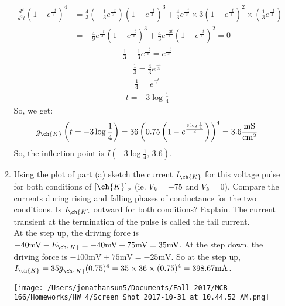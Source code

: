 \documentclass[11pt]{article}
\begin{document}
\begin{enumerate}[label=\arabic*.]
\begin{enumerate}[label=(\alph*)]
\begin{align*}
\frac{d^2} {d^2t} \left(1 - e^{\frac{-t} {3}}\right)^4 &= \frac{4} {3} \left(-\frac{1} {3} e^{\frac{-t} {3}}\right) \left(1 - e^{\frac{-t} {3}}\right)^3 + \frac{4} {3} e^{\frac{-t} {3}} \times 3 \left(1 - e^{\frac{-t} {3}}\right)^2 \times \left(\frac{1} {3} e^{\frac{-t} {3}}\right) \\
&= -\frac{4} {9} e^{\frac{-t} {3}} \left(1 - e^{\frac{-t} {3}}\right)^3 + \frac{4} {3} e^{\frac{-2t} {3}} \left(1 - e^{\frac{-t} {3}}\right)^2 = 0
\end{align*}
\begin{align*}
\frac{1} {3} - \frac{1} {3} e^{\frac{-t} {3}} = e^{\frac{-t} {3}}
\end{align*}
\begin{align*}
\frac{1} {3} = \frac{4} {3} e^{\frac{-t} {3}}
\end{align*}
\begin{align*}
\frac{1} {4} = e^{\frac{-t} {3}}
\end{align*}
\begin{align*}
t = -3 \log{\frac{1} {4}}
\end{align*}
So, we get:
\begin{align*}
g_{\ch{K}}\left(t = -3 \log{\frac{1} {4}}\right) = 36 \left(0.75 \left(1 - e^{\frac{3 \log{\frac{1} {4}}} {3}}\right)\right)^4 = 3.6 \frac{\text{mS}} {\text{cm}^2}
\end{align*}
So, the inflection point is $I\left(-3 \log{\frac{1} {4}} \text{, } 3.6\right)$.



\item
Using the plot of part (a) sketch the current $I_{\ch{K}}$ for this voltage pulse for both conditions of $[\ch{K}]_o$ (ie. $V_k = -75$ and $V_k = 0$). Compare the currents during rising and falling phases of conductance for the two conditions. Is $I_{\ch{K}}$ outward for both conditions? Explain. The current transient at the termination of the pulse is called the tail current.
\vspace*{1\baselineskip}
\\
At the step up, the driving force is $-40 \text{mV} - E_{\ch{K}} = -40 \text{mV} + 75 \text{mV} = 35 \text{mV}$. At the step down, the driving force is $-100 \text{mV} + 75 \text{mV} = -25 \text{mV}$. So at the step up, $I_{\ch{K}} = 35 \overline{g}_{\ch{K}}(0.75)^4 = 35 \times 36 \times (0.75)^4 = 398.67 \text{mA}$.
\begin{center}
\texttt{[image: /Users/jonathansun5/Documents/Fall 2017/MCB 166/Homeworks/HW 4/Screen Shot 2017-10-31 at 10.44.52 AM.png]}
\end{center}








\end{enumerate}
\end{enumerate}
\end{document}
